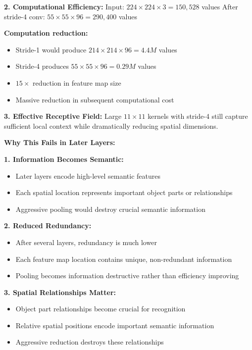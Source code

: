 \documentclass[12pt]{article}
\begin{document}
\begin{enumerate}[(a)]
{    \textbf{2. Computational Efficiency:}
    Input: $224 \times 224 \times 3 = 150,528$ values
    After stride-4 conv: $55 \times 55 \times 96 = 290,400$ values
    
    \textbf{Computation reduction:}
    \begin{itemize}
        \item Stride-1 would produce $214 \times 214 \times 96 = 4.4M$ values
        \item Stride-4 produces $55 \times 55 \times 96 = 0.29M$ values
        \item $15\times$ reduction in feature map size
        \item Massive reduction in subsequent computational cost
    \end{itemize}
    
    \textbf{3. Effective Receptive Field:}
    Large $11 \times 11$ kernels with stride-4 still capture sufficient local context while dramatically reducing spatial dimensions.
    
    \textbf{Why This Fails in Later Layers:}
    
    \textbf{1. Information Becomes Semantic:}
    \begin{itemize}
        \item Later layers encode high-level semantic features
        \item Each spatial location represents important object parts or relationships
        \item Aggressive pooling would destroy crucial semantic information
    \end{itemize}
    
    \textbf{2. Reduced Redundancy:}
    \begin{itemize}
        \item After several layers, redundancy is much lower
        \item Each feature map location contains unique, non-redundant information
        \item Pooling becomes information destructive rather than efficiency improving
    \end{itemize}
    
    \textbf{3. Spatial Relationships Matter:}
    \begin{itemize}
        \item Object part relationships become crucial for recognition
        \item Relative spatial positions encode important semantic information
        \item Aggressive reduction destroys these relationships
    \end{itemize}
    
}
\end{enumerate}
\end{document}
